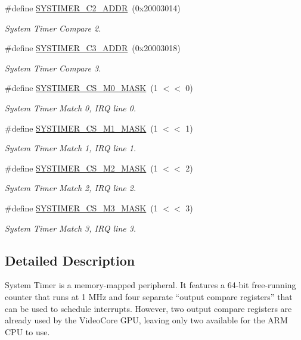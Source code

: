 \begin{DoxyCompactItemize}
\#define \hyperlink{group__SYSTIMER_ga8d9e4fe8ecd86538791452ac1e7edd5b}{S\+Y\+S\+T\+I\+M\+E\+R\+\_\+\+C2\+\_\+\+A\+D\+DR}~(0x20003014)
\begin{DoxyCompactList}\small\item\em System Timer Compare 2. \end{DoxyCompactList}\item 
\#define \hyperlink{group__SYSTIMER_ga54fb323df9fbd28f70a37115688fb446}{S\+Y\+S\+T\+I\+M\+E\+R\+\_\+\+C3\+\_\+\+A\+D\+DR}~(0x20003018)
\begin{DoxyCompactList}\small\item\em System Timer Compare 3. \end{DoxyCompactList}\item 
\#define \hyperlink{group__SYSTIMER_gab9771d55af9d871738ad146a91960714}{S\+Y\+S\+T\+I\+M\+E\+R\+\_\+\+C\+S\+\_\+\+M0\+\_\+\+M\+A\+SK}~(1 $<$$<$ 0)
\begin{DoxyCompactList}\small\item\em System Timer Match 0, I\+RQ line 0. \end{DoxyCompactList}\item 
\#define \hyperlink{group__SYSTIMER_gab109bde4c677a0039671e9d75100188b}{S\+Y\+S\+T\+I\+M\+E\+R\+\_\+\+C\+S\+\_\+\+M1\+\_\+\+M\+A\+SK}~(1 $<$$<$ 1)
\begin{DoxyCompactList}\small\item\em System Timer Match 1, I\+RQ line 1. \end{DoxyCompactList}\item 
\#define \hyperlink{group__SYSTIMER_ga2d59b9d5a0ad373d301f97dbac765adf}{S\+Y\+S\+T\+I\+M\+E\+R\+\_\+\+C\+S\+\_\+\+M2\+\_\+\+M\+A\+SK}~(1 $<$$<$ 2)
\begin{DoxyCompactList}\small\item\em System Timer Match 2, I\+RQ line 2. \end{DoxyCompactList}\item 
\#define \hyperlink{group__SYSTIMER_gaa925270b7e407cdf21f76e3bc5aee07f}{S\+Y\+S\+T\+I\+M\+E\+R\+\_\+\+C\+S\+\_\+\+M3\+\_\+\+M\+A\+SK}~(1 $<$$<$ 3)
\begin{DoxyCompactList}\small\item\em System Timer Match 3, I\+RQ line 3. \end{DoxyCompactList}\end{DoxyCompactItemize}


\subsection{Detailed Description}
System Timer is a memory-\/mapped peripheral. It features a 64-\/bit free-\/running counter that runs at 1 M\+Hz and four separate “output compare registers” that can be used to schedule interrupts. However, two output compare registers are already used by the Video\+Core G\+PU, leaving only two available for the A\+RM C\+PU to use. 

